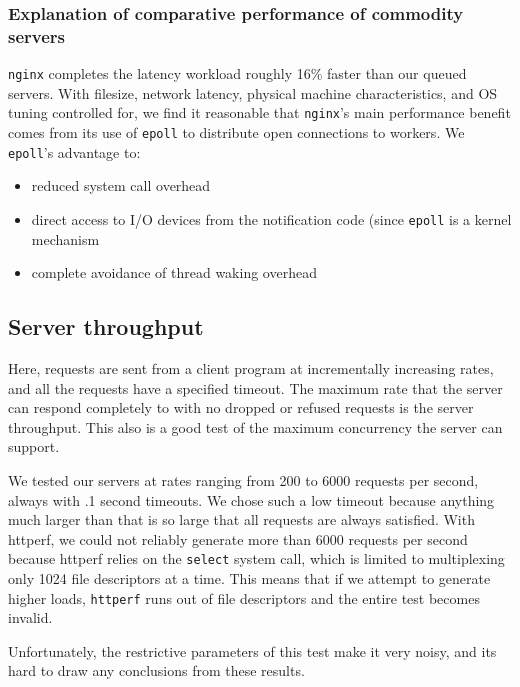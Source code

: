 \documentclass[twoside,10pt]{article}
\begin{document}
\begin{multicols}{2}
\subsubsection{Explanation of comparative performance of commodity
   servers}

 \verb+nginx+ completes the latency workload roughly 16\% faster than
 our queued servers. With filesize, network latency, physical machine
 characteristics, and OS tuning controlled for, we find it reasonable
 that \verb+nginx+'s main performance benefit comes from its use of
 \verb+epoll+ to distribute open connections to
 workers. We \verb+epoll+'s advantage to:

 \begin{itemize}
 \item reduced system call overhead
 \item direct access to I/O devices from the notification code (since
   \verb+epoll+ is a kernel mechanism
 \item complete avoidance of thread waking overhead
 \end{itemize}

\subsection{Server throughput}

Here, requests are sent from a client program at incrementally
increasing rates, and all the requests have a specified
timeout. The maximum rate that the server can respond completely to
with no dropped or refused requests is the server throughput. This
also is a good test of the maximum concurrency the server can support.

We tested our servers at rates ranging from 200 to 6000 requests per
second, always with .1 second timeouts. We chose such a low timeout
because anything much larger than that is so large that all requests
are always satisfied. With httperf, we could not reliably generate
more than 6000 requests per second because httperf relies on the
\verb+select+ system call, which is limited to multiplexing only 1024
file descriptors at a time. This means that if we attempt to generate
higher loads, \verb+httperf+ runs out of file descriptors and the
entire test becomes invalid.

Unfortunately, the restrictive parameters of this test make it very noisy, 
and its hard to draw any conclusions from these results. 


\end{multicols}
\end{document}

